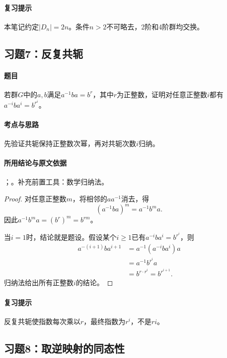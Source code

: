 \paragraph{复习提示}
本笔记约定$|D_n|=2n$。条件$n>2$不可略去，2阶和4阶群均交换。


\subsection{习题7：\texorpdfstring{反复共轭}{反复共轭}}
\label{ex:1:7}

\paragraph{题目}
若群$G$中的$a,b$满足$a^{-1}ba=b^r$，其中$r$为正整数，证明对任意正整数$i$都有$a^{-i}ba^i=b^{r^i}$。

\paragraph{考点与思路}
先验证共轭保持正整数次幂，再对共轭次数$i$归纳。

\paragraph{所用结论与原文依据}
；。补充前置工具：数学归纳法。


\begin{proof}
对任意正整数$m$，将相邻的$aa^{-1}$消去，得
\[
(a^{-1}ba)^m=a^{-1}b^ma.
\]
因此$a^{-1}b^ma=(b^r)^m=b^{rm}$。

当$i=1$时，结论就是题设。假设某个$i\geq1$已有$a^{-i}ba^i=b^{r^i}$，则
\begin{align*}
a^{-(i+1)}ba^{i+1}
&=a^{-1}(a^{-i}ba^i)a\\
&=a^{-1}b^{r^i}a\\
&=b^{r\cdot r^i}=b^{r^{i+1}}.
\end{align*}
归纳法给出所有正整数$i$的结论。
\end{proof}

\paragraph{复习提示}
反复共轭使指数每次乘以$r$，最终指数为$r^i$，不是$ri$。


\subsection{习题8：\texorpdfstring{取逆映射的同态性}{取逆映射的同态性}}
\label{ex:1:8}

